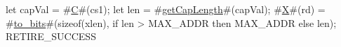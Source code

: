 let capVal = #\hyperref[sailRISCVzC]{C}#(cs1);
let len = #\hyperref[sailRISCVzgetCapLength]{getCapLength}#(capVal);
#\hyperref[sailRISCVzX]{X}#(rd) = #\hyperref[sailRISCVztozybits]{to\_bits}#(sizeof(xlen), if len > MAX_ADDR then MAX_ADDR else len);
RETIRE_SUCCESS
